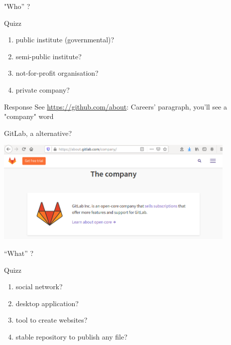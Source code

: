 \begin{frame}{ "Who” ?}
\begin{block}{Quizz}
\begin{enumerate}
    \item public institute (governmental)?
    \item semi-public institute?
    \item not-for-profit organisation?
    \item private company?
\end{enumerate}
\end{block}
\begin{block}{Response}
See \url{https://github.com/about}: Careers' paragraph, you'll see a "company" word
\end{block}
\end{frame}
\begin{frame}{GitLab, a  alternative?}
\begin{center}
\includegraphics[height=5cm]{05_history/Images/FAIR_gitlab_company.png}
\end{center}
\end{frame}
\begin{frame}{ “What” ?}
\begin{block}{Quizz}
\begin{enumerate}
    \item social network?
    \item desktop application?
    \item tool to create websites?
    \item stable repository to publish any file?
\end{enumerate}
\end{block}
\end{frame}
